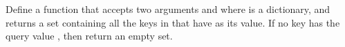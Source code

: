 \documentclass[letterpaper,10pt,english]{sphinxmanual}
\begin{document}
 Define a function  that accepts two arguments  and  where  is a dictionary, and returns a set containing all the keys in  that have  as its value. If no key has the query value , then return an empty set.

\begin{sphinxVerbatim}[commandchars=\\\{\}]
  
           \PYG{p}{[}\PYG{p}{]}  
\end{sphinxVerbatim}
\end{document}
